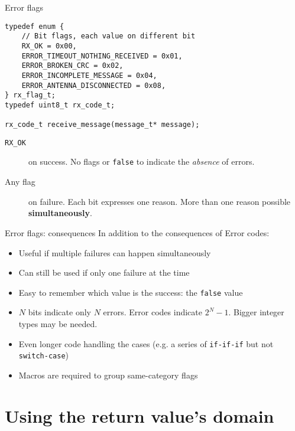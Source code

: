\documentclass[aspectratio=169,14pt]{beamer}
\begin{document}
\begin{frame}[fragile]{Error flags}
\begin{lstlisting}[style=cstyle]
typedef enum {
    // Bit flags, each value on different bit
    RX_OK = 0x00,
    ERROR_TIMEOUT_NOTHING_RECEIVED = 0x01,
    ERROR_BROKEN_CRC = 0x02,
    ERROR_INCOMPLETE_MESSAGE = 0x04,
    ERROR_ANTENNA_DISCONNECTED = 0x08,
} rx_flag_t;
typedef uint8_t rx_code_t;

rx_code_t receive_message(message_t* message);
\end{lstlisting}

\begin{description}
    \item[\texttt{RX\_OK}] on success. No flags or \texttt{false} to indicate the \textit{absence} of errors.
    \item[Any flag] on failure. Each bit expresses one reason. More than one reason possible \textbf{simultaneously}.
\end{description}
\end{frame}



\begin{frame}[fragile]{Error flags: consequences}
In addition to the consequences of Error codes:

\begin{itemize}
    \item[\good] Useful if multiple failures can happen simultaneously
    \item[\good] Can still be used if only one failure at the time
    \item[\good] Easy to remember which value is the success: the \texttt{false} value
    \item[\bad] \(N\) bits indicate only \(N\) errors. Error codes indicate \(2^N - 1\). Bigger integer types may be needed.
    \item[\bad] Even longer code handling the cases (e.g. a series of \texttt{if-if-if} but not \texttt{switch-case})
    \item[\bad] Macros are required to group same-category flags
\end{itemize}
\end{frame}





\section{Using the return value's domain}
\end{document}
